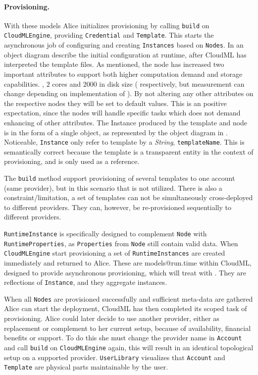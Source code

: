 \paragraph{Provisioning.}


With these models Alice initializes provisioning by calling 
\texttt{build} on \texttt{CloudMLEngine}, providing \texttt{Credential} and \texttt{Template}.
This starts the asynchronous job of configuring and creating 
\texttt{Instances} based on \texttt{Nodes}.
In  an object diagram describe the initial configuration at runtime,
after CloudML has interpreted the template files.
As mentioned, the node has increased two important attributes to support both higher computation 
demand and storage capabilities. \ie, $2$ cores and $2000$ in disk size 
( respectively, but measurement can change depending on implementation of ).
By not altering any other attributes on the respective nodes they will be set to default values.
This is an positive expectation, since the nodes will handle specific tasks which does not 
demand enhancing of other attributes.
The Instance produced by the template and node is in the form of a single object,
as represented by the object diagram in .
Noticeable, \texttt{Instance} only refer to template by a \emph{String}, \texttt{templateName}.
This is semantically correct because the template is a transparent entity
in the context of provisioning, and is only used as a reference.

The \texttt{build} method support provisioning of several templates to one account (same provider),
but in this scenario that is not utilized.
There is also a constraint/limitation, a set of templates can not be simultaneously 
cross-deployed to different providers. 
They can, however, be re-provisioned sequentially
to different providers.

\texttt{RuntimeInstance} is specifically designed to complement \texttt{Node} with \texttt{RuntimeProperties},
as \texttt{Properties} from \texttt{Node} still contain valid data.
When \texttt{CloudMLEngine} start provisioning a set of \texttt{RuntimeInstances} are created immediately 
and returned to Alice.
These are models@run.time within CloudML, designed to provide asynchronous provisioning,
which will treat with .
They are reflections of \texttt{Instance}, and they aggregate instances.

When all \texttt{Nodes} are provisioned successfully and sufficient meta-data are gathered
Alice can start the deployment, CloudML has then completed its scoped task of provisioning.
Alice could later decide to use another provider, either as replacement or complement to her current setup,
because of availability, financial benefits or support.
To do this she must change the provider name in \texttt{Account} and call \texttt{build} on \texttt{CloudMLEngine} again,
this will result in an identical topological setup on a supported provider.
\texttt{UserLibrary} visualizes that \texttt{Account} and \texttt{Template} are 
physical parts maintainable by the user.

